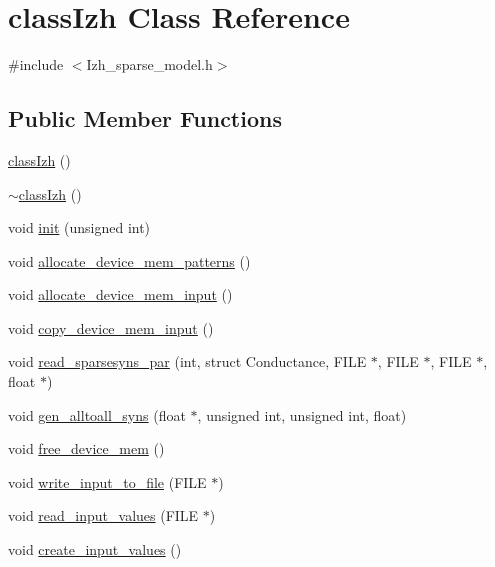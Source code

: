 \hypertarget{classclassIzh}{\section{class\+Izh Class Reference}
\label{classclassIzh}
}


{\ttfamily \#include $<$Izh\+\_\+sparse\+\_\+model.\+h$>$}

\subsection*{Public Member Functions}
\begin{DoxyCompactItemize}
\item 
\hyperlink{classclassIzh_a2b13361aa84b9d2b4d6ed1f8b3a83280}{class\+Izh} ()
\item 
\hyperlink{classclassIzh_a06b95847ce84d932d67357ee5f67cdb4}{$\sim$class\+Izh} ()
\item 
void \hyperlink{classclassIzh_a9d857d14090cc9ad27376d4430d14097}{init} (unsigned int)
\item 
void \hyperlink{classclassIzh_afb7e0ee19c092c388b7c9a892aea5f1c}{allocate\+\_\+device\+\_\+mem\+\_\+patterns} ()
\item 
void \hyperlink{classclassIzh_af7e70326650adf3445f7d36e2135a505}{allocate\+\_\+device\+\_\+mem\+\_\+input} ()
\item 
void \hyperlink{classclassIzh_aa13d5c82fb1656eb849c0e6235b17050}{copy\+\_\+device\+\_\+mem\+\_\+input} ()
\item 
void \hyperlink{classclassIzh_a52cb833ef2ffa20a6bb7be0665394cf2}{read\+\_\+sparsesyns\+\_\+par} (int, struct Conductance, F\+I\+L\+E $\ast$, F\+I\+L\+E $\ast$, F\+I\+L\+E $\ast$, float $\ast$)
\item 
void \hyperlink{classclassIzh_aeae590d32336966c62f68489ebdc89bd}{gen\+\_\+alltoall\+\_\+syns} (float $\ast$, unsigned int, unsigned int, float)
\item 
void \hyperlink{classclassIzh_a931d1414232340a14769339acbf9a5fb}{free\+\_\+device\+\_\+mem} ()
\item 
void \hyperlink{classclassIzh_a27f8e522081a245e42e501436f4763ca}{write\+\_\+input\+\_\+to\+\_\+file} (F\+I\+L\+E $\ast$)
\item 
void \hyperlink{classclassIzh_a2e61b42ce2edc2d51899ba450d40ab23}{read\+\_\+input\+\_\+values} (F\+I\+L\+E $\ast$)
\item 
void \hyperlink{classclassIzh_af5c816414db830ad5085fa9620435bfe}{create\+\_\+input\+\_\+values} ()
\item 

\end{DoxyCompactItemize}
